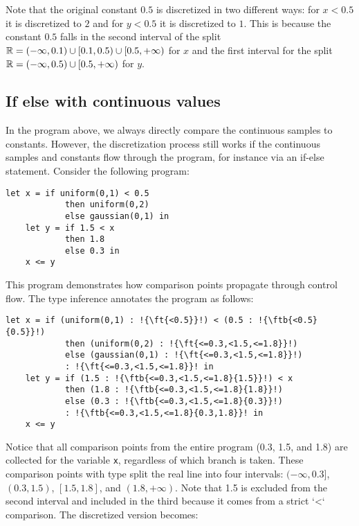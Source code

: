 Note that the original constant $0.5$ is discretized in two different ways: for $x < 0.5$ it is discretized to $2$ and for $y < 0.5$ it is discretized to $1$. This is because the constant $0.5$ falls in the second interval of the split $\mathbb{R} = (-\infty, 0.1) \cup [0.1, 0.5) \cup [0.5, +\infty)$ for $x$ and the first interval for the split $\mathbb{R} = (-\infty, 0.5) \cup [0.5, +\infty)$ for $y$.

\subsection{If else with continuous values}

In the program above, we always directly compare the continuous samples to constants.
However, the discretization process still works if the continuous samples and constants flow through the program, for instance via an if-else statement.
Consider the following program:

\begin{lstlisting}[aboveskip=1em,belowskip=1em,escapechar=!]
    let x = if uniform(0,1) < 0.5 
            then uniform(0,2) 
            else gaussian(0,1) in
    let y = if 1.5 < x
            then 1.8
            else 0.3 in
    x <= y
\end{lstlisting}

\noindent This program demonstrates how comparison points propagate through control flow. The type inference annotates the program as follows:

\begin{lstlisting}[aboveskip=1em,belowskip=1em,escapechar=!]
    let x = if (uniform(0,1) : !{\ft{<0.5}}!) < (0.5 : !{\ftb{<0.5}{0.5}}!)
            then (uniform(0,2) : !{\ft{<=0.3,<1.5,<=1.8}}!)
            else (gaussian(0,1) : !{\ft{<=0.3,<1.5,<=1.8}}!)
            : !{\ft{<=0.3,<1.5,<=1.8}}! in
    let y = if (1.5 : !{\ftb{<=0.3,<1.5,<=1.8}{1.5}}!) < x
            then (1.8 : !{\ftb{<=0.3,<1.5,<=1.8}{1.8}}!)
            else (0.3 : !{\ftb{<=0.3,<1.5,<=1.8}{0.3}}!)
            : !{\ftb{<=0.3,<1.5,<=1.8}{0.3,1.8}}! in
    x <= y
\end{lstlisting}

\noindent Notice that all comparison points from the entire program (0.3, 1.5, and 1.8) are collected for the variable \texttt{x}, regardless of which branch is taken. These comparison points with type  split the real line into four intervals: $(-\infty, 0.3]$, $(0.3, 1.5)$, $[1.5, 1.8]$, and $(1.8, +\infty)$. Note that 1.5 is excluded from the second interval and included in the third because it comes from a strict `<` comparison. The discretized version becomes:

